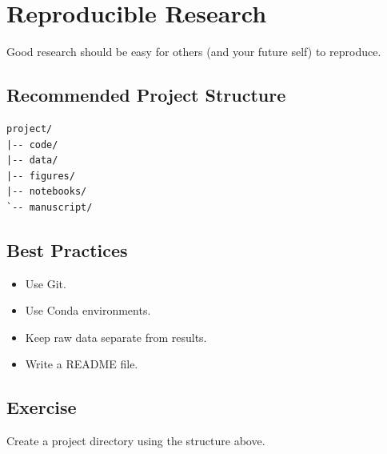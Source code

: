 \section{Reproducible Research}

Good research should be easy for others (and your future self) to reproduce.

\subsection{Recommended Project Structure}

\begin{lstlisting}
project/
|-- code/
|-- data/
|-- figures/
|-- notebooks/
`-- manuscript/
\end{lstlisting}

\subsection{Best Practices}

\begin{itemize}
\item Use Git.
\item Use Conda environments.
\item Keep raw data separate from results.
\item Write a README file.
\end{itemize}

\subsection{Exercise}

Create a project directory using the structure above.
